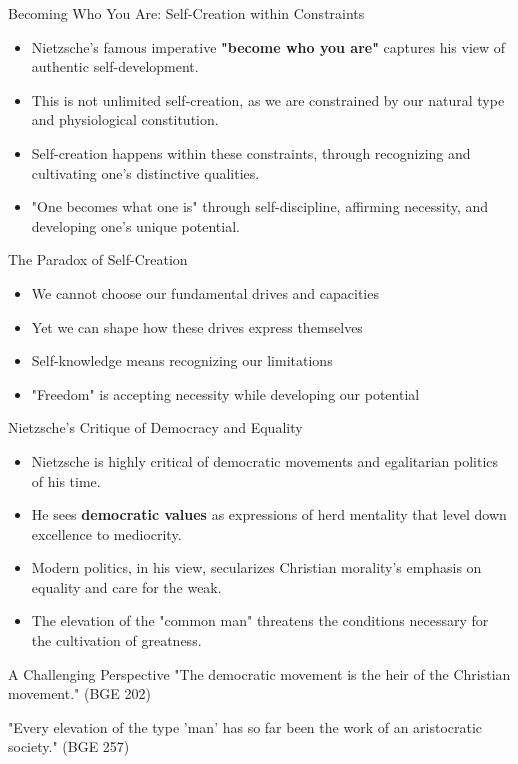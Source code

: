 \documentclass{beamer}
\begin{document}
\begin{frame}{Becoming Who You Are: Self-Creation within Constraints}
\begin{itemize}
\item Nietzsche's famous imperative \textbf{"become who you are"} captures his view of authentic self-development.
\item This is not unlimited self-creation, as we are constrained by our natural type and physiological constitution.
\item Self-creation happens within these constraints, through recognizing and cultivating one's distinctive qualities.
\item "One becomes what one is" through self-discipline, affirming necessity, and developing one's unique potential.
\end{itemize}

\begin{block}{The Paradox of Self-Creation}
\begin{itemize}
\item We cannot choose our fundamental drives and capacities
\item Yet we can shape how these drives express themselves
\item Self-knowledge means recognizing our limitations
\item "Freedom" is accepting necessity while developing our potential
\end{itemize}
\end{block}
\end{frame}

\begin{frame}{Nietzsche's Critique of Democracy and Equality}
\begin{itemize}
\item Nietzsche is highly critical of democratic movements and egalitarian politics of his time.
\item He sees \textbf{democratic values} as expressions of herd mentality that level down excellence to mediocrity.
\item Modern politics, in his view, secularizes Christian morality's emphasis on equality and care for the weak.
\item The elevation of the "common man" threatens the conditions necessary for the cultivation of greatness.
\end{itemize}

\begin{alertblock}{A Challenging Perspective}
"The democratic movement is the heir of the Christian movement." (BGE 202)

"Every elevation of the type 'man' has so far been the work of an aristocratic society." (BGE 257) 
\end{alertblock}
\end{frame}
\end{document}
